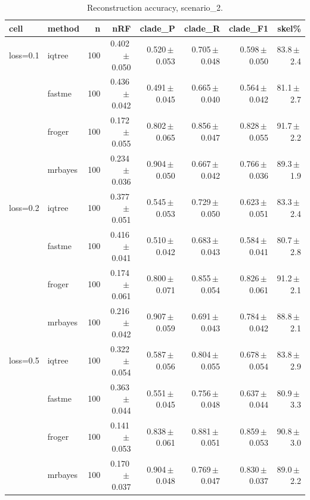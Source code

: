 \begin{table}[t]
\centering
\caption{Reconstruction accuracy, scenario\_2.}
\label{tab:scenario2}
\begin{tabular}{ll r rrrrr}
\toprule
cell & method & n & nRF & clade\_P & clade\_R & clade\_F1 & skel\% \\
\midrule
loss=0.1 & iqtree & 100 & 0.402\,$\pm$\,0.050 & 0.520\,$\pm$\,0.053 & 0.705\,$\pm$\,0.048 & 0.598\,$\pm$\,0.050 & 83.8\,$\pm$\,2.4 \\
 & fastme & 100 & 0.436\,$\pm$\,0.042 & 0.491\,$\pm$\,0.045 & 0.665\,$\pm$\,0.040 & 0.564\,$\pm$\,0.042 & 81.1\,$\pm$\,2.7 \\
 & froger & 100 & 0.172\,$\pm$\,0.055 & 0.802\,$\pm$\,0.065 & 0.856\,$\pm$\,0.047 & 0.828\,$\pm$\,0.055 & 91.7\,$\pm$\,2.2 \\
 & mrbayes & 100 & 0.234\,$\pm$\,0.036 & 0.904\,$\pm$\,0.050 & 0.667\,$\pm$\,0.042 & 0.766\,$\pm$\,0.036 & 89.3\,$\pm$\,1.9 \\
loss=0.2 & iqtree & 100 & 0.377\,$\pm$\,0.051 & 0.545\,$\pm$\,0.053 & 0.729\,$\pm$\,0.050 & 0.623\,$\pm$\,0.051 & 83.3\,$\pm$\,2.4 \\
 & fastme & 100 & 0.416\,$\pm$\,0.041 & 0.510\,$\pm$\,0.042 & 0.683\,$\pm$\,0.043 & 0.584\,$\pm$\,0.041 & 80.7\,$\pm$\,2.8 \\
 & froger & 100 & 0.174\,$\pm$\,0.061 & 0.800\,$\pm$\,0.071 & 0.855\,$\pm$\,0.054 & 0.826\,$\pm$\,0.061 & 91.2\,$\pm$\,2.1 \\
 & mrbayes & 100 & 0.216\,$\pm$\,0.042 & 0.907\,$\pm$\,0.059 & 0.691\,$\pm$\,0.043 & 0.784\,$\pm$\,0.042 & 88.8\,$\pm$\,2.1 \\
loss=0.5 & iqtree & 100 & 0.322\,$\pm$\,0.054 & 0.587\,$\pm$\,0.056 & 0.804\,$\pm$\,0.055 & 0.678\,$\pm$\,0.054 & 83.8\,$\pm$\,2.9 \\
 & fastme & 100 & 0.363\,$\pm$\,0.044 & 0.551\,$\pm$\,0.045 & 0.756\,$\pm$\,0.048 & 0.637\,$\pm$\,0.044 & 80.9\,$\pm$\,3.3 \\
 & froger & 100 & 0.141\,$\pm$\,0.053 & 0.838\,$\pm$\,0.061 & 0.881\,$\pm$\,0.051 & 0.859\,$\pm$\,0.053 & 90.8\,$\pm$\,3.0 \\
 & mrbayes & 100 & 0.170\,$\pm$\,0.037 & 0.904\,$\pm$\,0.048 & 0.769\,$\pm$\,0.047 & 0.830\,$\pm$\,0.037 & 89.0\,$\pm$\,2.2 \\
\bottomrule
\end{tabular}
\end{table}